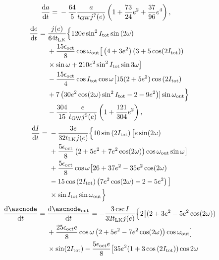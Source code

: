 \documentclass[10pt]{article}%
\newcommand*{\rd}[2]{\frac{\mathrm{d}#1}{\mathrm{d}#2}}
\newcommand*{\p}[1]{\left(#1\right)}
\begin{document}
{\small
\begin{align}
    \rd{a}{t} ={}& -\frac{64}{5}\frac{a}{t_{\rm GW}j^7(e)}
            \p{1 + \frac{73}{24}e^2 +
            \frac{37}{96}e^4},
\end{align}
\begin{align}
    \rd{e}{t} ={}& \frac{j(e)}{64t_{\rm LK}}\Big\{
            120 e \sin^2 I_{\rm tot} \sin \p{2\omega}\nonumber\\
        &+ \frac{15 \epsilon_{\rm oct}}{8}\cos \omega_{\rm out}
            \big[\p{4 + 3e^2}\p{3 + 5\cos (2I_{\rm tot})}\nonumber\\
        &\times \sin \omega + 210 e^2\sin^2I_{\rm tot} \sin 3\omega\big]
            \nonumber\\
        &- \frac{15 \epsilon_{\rm oct}}{4} \cos I_{\rm tot} \cos \omega
            \big[15(2 + 5e^2) \cos \p{2I_{\rm tot}}\nonumber\\
        &+ 7\p{30 e^2 \cos(2\omega) \sin^2 I_{\rm tot} - 2 - 9e^2}]
                \sin \omega_{\rm out}\Big\}\nonumber\\
        &- \frac{304}{15}\frac{e}{t_{\rm GW}j^5(e)}
            \p{1 + \frac{121}{304}e^2},
\end{align}
\begin{align}
    \rd{I}{t} ={}& -\frac{3e}{32t_{\rm LK}j(e)}\Big\{
            10\sin\p{2I_{\rm tot}}\big[e \sin (2\omega)\nonumber\\
        &+ \frac{5\epsilon_{\rm oct}}{8}\p{2 + 5e^2 + 7e^2\cos(2\omega)}
            \cos \omega_{\rm out}\sin \omega\big]\nonumber\\
        &+ \frac{5\epsilon_{\rm oct}}{8} \cos \omega \big[
            26 + 37e^2 -35 e^2\cos(2\omega)\nonumber\\
        &- 15\cos\p{2I_{\rm tot}}\p{7e^2\cos (2\omega) - 2 - 5e^2}\big]\nonumber\\
        &\times \sin I_{\rm tot}\sin \omega_{\rm out}\Big\}
\end{align}
\begin{align}
    \rd{\ascnode}{t} ={}& \rd{\ascnode_{\rm out}}{t}
            = -\frac{3\csc I}{32 t_{\rm LK}j(e)}\Big\{
            2\big[(2 + 3e^2 - 5e^2 \cos (2\omega))\nonumber\\
        &+ \frac{25 \epsilon_{\rm oct}e}{8} \cos \omega
            \p{2 + 5e^2 - 7e^2\cos(2\omega)}\cos \omega_{\rm out}\big]\nonumber\\
        &\times\sin (2I_{\rm tot}) - \frac{5\epsilon_{\rm oct}e}{8}
            \big[35e^2(1 + 3\cos\p{2I_{\rm tot}})\cos 2\omega\nonumber\\

\end{align}}
\end{document}
